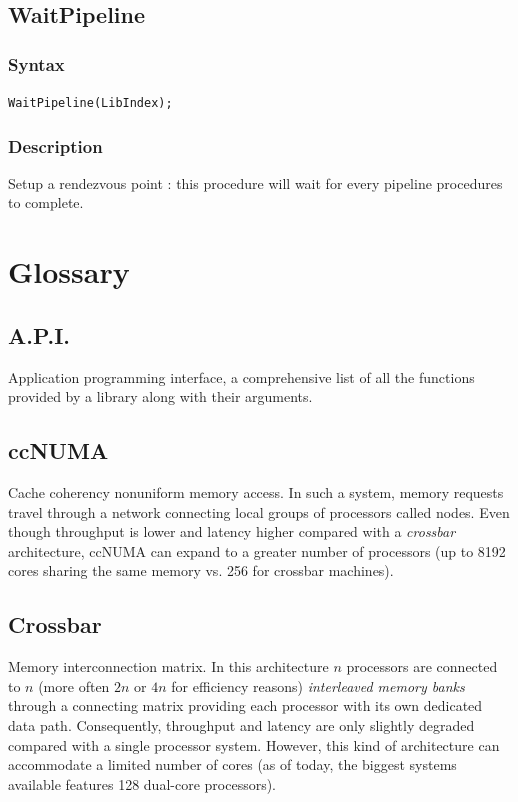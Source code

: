 \documentclass[a4paper,12pt]{article}
\begin{document}
\subsection{WaitPipeline}

\subsubsection*{Syntax}
\tt{WaitPipeline(LibIndex);}
\normalfont

\subsubsection*{Description}
Setup a rendezvous point : this procedure will wait for every pipeline procedures to complete.


%
%


\section{Glossary}

\subsection{A.P.I.}
Application programming interface, a comprehensive list of all the functions provided by a library along with their arguments.

\subsection{ccNUMA}
Cache coherency nonuniform memory access. In such a system, memory requests travel through a network connecting local groups of processors called nodes. Even though throughput is lower and latency higher compared with a \emph{crossbar} architecture, ccNUMA can expand to a greater number of processors (up to 8192 cores sharing the same memory vs. 256 for crossbar machines).

\subsection{Crossbar}
Memory interconnection matrix. In this architecture $n$ processors are connected to $n$ (more often $2n$ or $4n$ for efficiency reasons) \emph{interleaved memory banks} through a connecting matrix providing each processor with its own dedicated data path. Consequently, throughput and latency are only slightly degraded compared with a single processor system. However, this kind of architecture can accommodate a limited number of cores (as of today, the biggest systems available features 128 dual-core processors).
\end{document}

